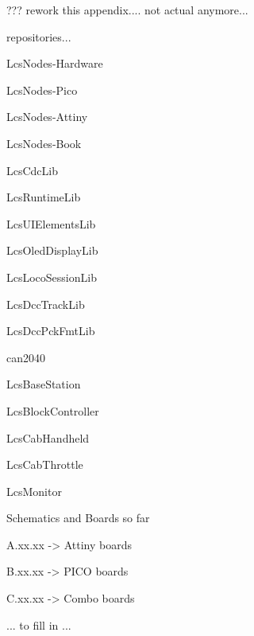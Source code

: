 
??? rework this appendix.... not actual anymore...



repositories...

\begin{smallGapItemize}
\item{LcsNodes-Hardware}
\item LcsNodes-Pico
\item LcsNodes-Attiny
\item LcsNodes-Book
\end{smallGapItemize}



\begin{smallGapItemize}
\item LcsCdcLib
\item LcsRuntimeLib
\item LcsUIElementsLib
\item LcsOledDisplayLib
\item LcsLocoSessionLib
\item LcsDccTrackLib
\item LcsDccPckFmtLib
\end{smallGapItemize}


\begin{smallGapItemize}
\item can2040
\end{smallGapItemize}


\begin{smallGapItemize}
\item LcsBaseStation
\item LcsBlockController
\item LcsCabHandheld
\item LcsCabThrottle
\item LcsMonitor
\end{smallGapItemize}


Schematics and Boards so far

A.xx.xx -> Attiny boards

B.xx.xx -> PICO boards

C.xx.xx -> Combo boards


... to fill in ...

